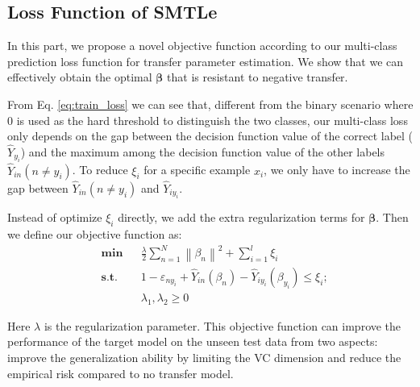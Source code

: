 \subsection{Loss Function of SMTLe}
In this part, we propose a novel objective function according to our multi-class prediction loss function for transfer parameter estimation. We show that we can effectively obtain the optimal  $\boldsymbol{\beta}$ that is resistant to negative transfer. 
 
From Eq. \eqref{eq:train_loss} we can see that, different from the binary scenario where 0 is used as the hard threshold to distinguish the two classes, our multi-class loss only depends on the gap between the decision function value of the correct label ($\hat Y_{y_i}$) and the maximum among the decision function value of the other labels ${{\hat Y}_{in}}(n \ne y_i)$. To reduce $\xi_i$ for a specific example $x_i$, we only have to increase the gap between ${{\hat Y}_{in}(n \ne y_i)}$ and ${{\hat Y}_{i{y_i}}}$. 


Instead of optimize $\xi_i$ directly, we add the extra regularization terms for $\boldsymbol{\beta}$. Then we define our objective function as:
\begin{equation}\label{eq:loss}
\begin{aligned}
& \textbf{min}
& & \frac{{{\lambda}}}{2}\sum\limits_{n = 1}^N {{{\left\| {{\beta _{n}}} \right\|}^2}}  + \sum\limits_{i = 1}^l {{\xi _i}}   \\
& \textbf{s.t.}
& & 1 - {\varepsilon _{n{y_i}}} + {\hat Y_{in}}\left( {\beta_n } \right) - {\hat Y_{i{y_i}}}\left( {\beta_{y_i} } \right) \le {\xi_i};\\
& & &\lambda_1,\lambda_2 \ge 0
\end{aligned}
\end{equation}

Here $\lambda$ is the regularization parameter. This objective function can improve the performance of the target model on the unseen test data from two aspects: improve the generalization ability by limiting the VC dimension and reduce the empirical risk compared to no transfer model.

